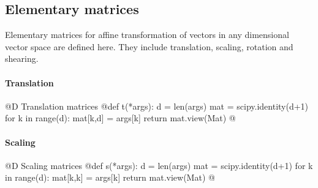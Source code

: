 \documentclass[11pt,oneside]{article}    %
\begin{document}
\subsection{Elementary matrices}
Elementary matrices for affine transformation of vectors in any dimensional vector space are defined here. They include translation, scaling, rotation and shearing. 

\paragraph{Translation}
@D Translation matrices
@{def t(*args): 
    d = len(args)
    mat = scipy.identity(d+1)
    for k in range(d): 
        mat[k,d] = args[k]
    return mat.view(Mat)
@}
\paragraph{Scaling}
@D Scaling matrices
@{def s(*args): 
    d = len(args)
    mat = scipy.identity(d+1)
    for k in range(d): 
        mat[k,k] = args[k]
    return mat.view(Mat)
@}
\end{document}
